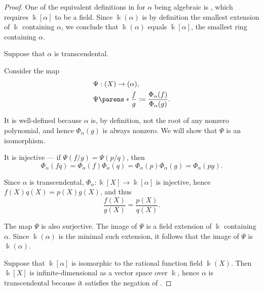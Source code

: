 \begin{proof}
   One of the equivalent definitions in  for \( \alpha \) being algebraic is , which requires \( \Bbbk[\alpha] \) to be a field. Since \( \Bbbk(\alpha) \) is by definition the smallest extension of \( \Bbbk \) containing \( \alpha \), we conclude that \( \Bbbk(\alpha) \) equals \( \Bbbk[\alpha] \), the smallest ring containing \( \alpha \).


  \SufficiencySubProof* Suppose that \( \alpha \) is transcendental.

  Consider the map
  \begin{equation*}
    \begin{aligned}
      &\Psi: \Bbbk(X) \to \Bbbk(\alpha), \\
      &\Psi\parens*{ \frac f g } \coloneqq \frac {\Phi_\alpha(f)} {\Phi_\alpha(g)}.
    \end{aligned}
  \end{equation*}

  It is well-defined because \( \alpha \) is, by definition, not the root of any nonzero polynomial, and hence \( \Phi_\alpha(g) \) is always nonzero. We will show that \( \Psi \) is an isomorphism.

  It is injective --- if \( \Psi(f / g) = \Psi(p / q) \), then
  \begin{equation*}
    \Phi_\alpha(fq) = \Phi_\alpha(f) \Phi_\alpha(q) = \Phi_\alpha(p) \Phi_\alpha(g) = \Phi_\alpha(pg).
  \end{equation*}

  Since \( \alpha \) is transcendental, \( \Phi_\alpha: \Bbbk[X] \to \Bbbk[\alpha] \) is injective, hence \( f(X) q(X) = p(X) g(X) \), and thus
  \begin{equation*}
    \frac {f(X)} {g(X)} = \frac {p(X)} {q(X)}.
  \end{equation*}

  The map \( \Psi \) is also surjective. The image of \( \Psi \) is a field extension of \( \Bbbk \) containing \( \alpha \). Since \( \Bbbk(\alpha) \) is the minimal such extension, it follows that the image of \( \Psi \) is \( \Bbbk(\alpha) \).

  \NecessitySubProof* Suppose that \( \Bbbk[\alpha] \) is isomorphic to the rational function field \( \Bbbk(X) \). Then \( \Bbbk[X] \) is infinite-dimensional as a vector space over \( \Bbbk \), hence \( \alpha \) is transcendental because it satisfies the negation of .
\end{proof}

